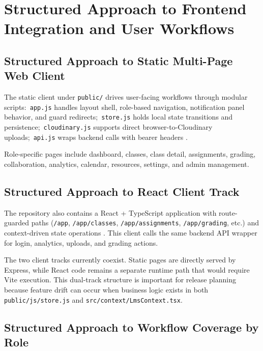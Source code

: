 \section{Structured Approach to Frontend Integration and User Workflows}

\subsection{Structured Approach to Static Multi-Page Web Client}

The static client under \texttt{public/} drives user-facing workflows through modular scripts:\
\texttt{app.js} handles layout shell, role-based navigation, notification panel behavior, and guard redirects;\
\texttt{store.js} holds local state transitions and persistence;\
\texttt{cloudinary.js} supports direct browser-to-Cloudinary uploads;\
\texttt{api.js} wraps backend calls with bearer headers \cite{repo-public-ui,repo-upload}.

Role-specific pages include dashboard, classes, class detail, assignments, grading, collaboration, analytics, calendar, resources, settings, and admin management.

\subsection{Structured Approach to React Client Track}

The repository also contains a React + TypeScript application with route-guarded paths (\texttt{/app}, \texttt{/app/classes}, \texttt{/app/assignments}, \texttt{/app/grading}, etc.) and context-driven state operations \cite{repo-react-ui}. This client calls the same backend API wrapper for login, analytics, uploads, and grading actions.

The two client tracks currently coexist. Static pages are directly served by Express, while React code remains a separate runtime path that would require Vite execution. This dual-track structure is important for release planning because feature drift can occur when business logic exists in both \texttt{public/js/store.js} and \texttt{src/context/LmsContext.tsx}.

\subsection{Structured Approach to Workflow Coverage by Role}


